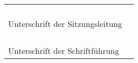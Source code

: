 \begin{tabular}{ll}
&\\
&\\
&\\
&\\ \hline
Unterschrift der Sitzungsleitung & \\
&\\
&\\
&\\
&\\ \hline
Unterschrift der Schriftführung & \\
\end{tabular}
